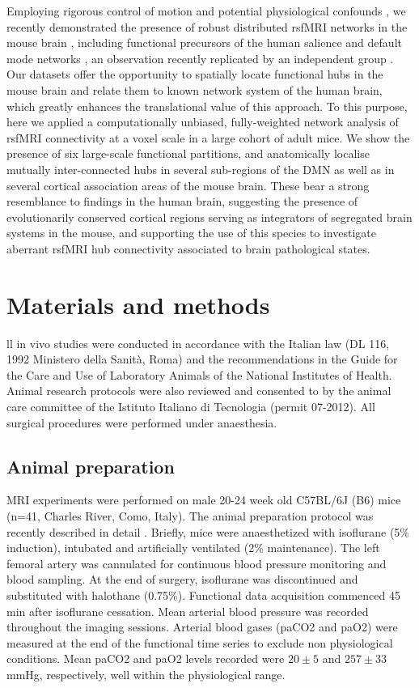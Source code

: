 Employing rigorous control of motion and potential physiological confounds
\parencite{ferrari2012}, we recently demonstrated the presence of robust
distributed rsfMRI networks in the mouse brain \parencite{zhan2014}, including
functional precursors of the human salience and default mode networks
\parencite{sforazzini2014, sforazzini2016}, an observation recently replicated
by an independent group \parencite{stafford2014}. Our datasets offer the
opportunity to spatially locate functional hubs in the mouse brain and relate
them to known network system of the human brain, which greatly enhances the
translational value of this approach. To this purpose, here we applied a
computationally unbiased, fully-weighted network analysis of rsfMRI connectivity
at a voxel scale in a large cohort of adult mice. We show the presence of six
large-scale functional partitions, and anatomically localise mutually
inter-connected hubs in several sub-regions of the DMN as well as in several
cortical association areas of the mouse brain. These bear a strong resemblance
to findings in the human brain, suggesting the presence of evolutionarily
conserved cortical regions serving as integrators of segregated brain systems in
the mouse, and supporting the use of this species to investigate aberrant rsfMRI
hub connectivity associated to brain pathological states.

\section{Materials and methods}
ll in vivo studies were conducted in accordance with the Italian law (DL 116,
1992 Ministero della Sanità, Roma) and the recommendations in the Guide for the
Care and Use of Laboratory Animals of the National Institutes of Health. Animal
research protocols were also reviewed and consented to by the animal care
committee of the Istituto Italiano di Tecnologia (permit 07-2012). All surgical
procedures were performed under anaesthesia.

\subsection{Animal preparation}
MRI experiments were performed on male 20-24 week old C57BL/6J (B6) mice (n=41,
Charles River, Como, Italy). The animal preparation protocol was recently
described in detail \parencite{ferrari2012, sforazzini2014, sforazzini2016,
zhan2014}.  Briefly, mice were anaesthetized with isoflurane (5\% induction),
intubated and artificially ventilated (2\% maintenance). The left femoral artery
was cannulated for continuous blood pressure monitoring and blood sampling. At
the end of surgery, isoflurane was discontinued and substituted with halothane
(0.75\%).  Functional data acquisition commenced 45 min after isoflurane
cessation. Mean arterial blood pressure was recorded throughout the imaging
sessions. Arterial blood gases (paCO2 and paO2) were measured at the end of the
functional time series to exclude non physiological conditions. Mean paCO2 and
paO2 levels recorded were $20\pm5$ and $257\pm33$ mmHg, respectively, well
within the physiological range.  

